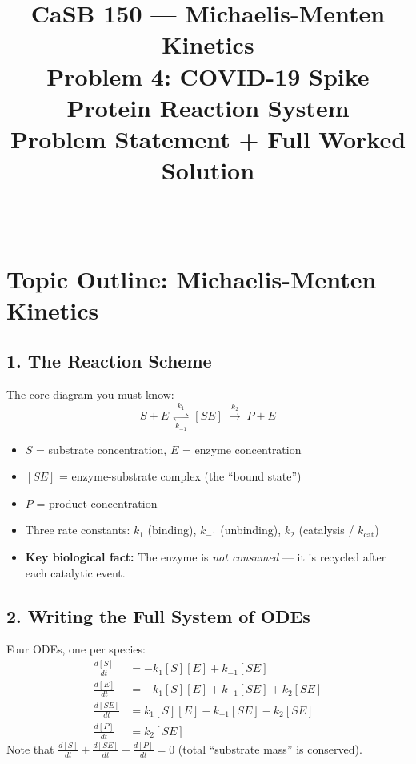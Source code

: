 \documentclass[12pt]{article}
\title{
  \textbf{\large CaSB 150 --- Michaelis-Menten Kinetics}\\[6pt]
  \large Problem 4: COVID-19 Spike Protein Reaction System\\[4pt]
  \normalsize Problem Statement + Full Worked Solution
}
\author{}
\date{}
\begin{document}
\maketitle
\vspace{-1em}
\hrule
\vspace{1.5em}


\section*{Topic Outline: Michaelis-Menten Kinetics}

\subsection*{1. The Reaction Scheme}

The core diagram you must know:
\[
  S + E \;\underset{k_{-1}}{\overset{k_1}{\rightleftharpoons}}\; [SE] \;\overset{k_2}{\longrightarrow}\; P + E
\]
\begin{itemize}[noitemsep]
  \item $S$ = substrate concentration, $E$ = enzyme concentration
  \item $[SE]$ = enzyme-substrate complex (the ``bound state'')
  \item $P$ = product concentration
  \item Three rate constants: $k_1$ (binding), $k_{-1}$ (unbinding), $k_2$ (catalysis / $k_{\text{cat}}$)
  \item \textbf{Key biological fact:} The enzyme is \emph{not consumed} --- it is recycled after each catalytic event.
\end{itemize}

\subsection*{2. Writing the Full System of ODEs}

Four ODEs, one per species:
\begin{align*}
  \frac{d[S]}{dt}  &= -k_1[S][E] + k_{-1}[SE] \\
  \frac{d[E]}{dt}  &= -k_1[S][E] + k_{-1}[SE] + k_2[SE] \\
  \frac{d[SE]}{dt} &= k_1[S][E] - k_{-1}[SE] - k_2[SE] \\
  \frac{d[P]}{dt}  &= k_2[SE]
\end{align*}
Note that $\frac{d[S]}{dt} + \frac{d[SE]}{dt} + \frac{d[P]}{dt} = 0$ (total ``substrate mass'' is conserved).
\end{document}
